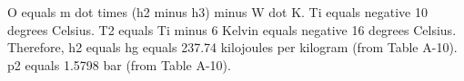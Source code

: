 O equals m dot times (h2 minus h3) minus W dot K.  
Ti equals negative 10 degrees Celsius.  
T2 equals Ti minus 6 Kelvin equals negative 16 degrees Celsius.  
Therefore, h2 equals hg equals 237.74 kilojoules per kilogram (from Table A-10).  
p2 equals 1.5798 bar (from Table A-10).